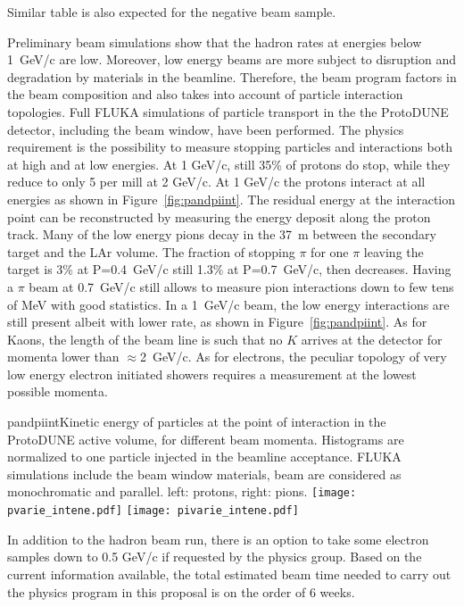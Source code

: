 Similar table is also expected for the negative beam sample. 

Preliminary beam simulations show that the hadron rates at 
energies below 1~GeV/c are low. Moreover, low energy beams are more
subject to disruption and degradation by materials in the
beamline. Therefore, the beam program factors in the beam composition and also takes
into account of particle interaction topologies.  Full FLUKA\cite{fluka05,Fluka15}
 simulations
of particle transport in the the ProtoDUNE detector, including the
beam window, have been performed.
 The physics requirement is the possibility to measure
 stopping particles and  interactions both at high and at low energies.    
At 1 GeV/c, still 35\% of protons do stop, while they reduce to only 5
per mill at 2 GeV/c.  At  1 GeV/c  the protons interact at all
energies as shown in
Figure~\ref{fig:pandpiint}. The residual energy at the interaction
point can be reconstructed by measuring the energy deposit along the proton track.
Many of the  low energy pions decay in the 37~m between the secondary target
and the LAr volume.  The fraction of stopping $\pi$ for one $\pi$
leaving the target is 3\% at P=0.4~GeV/c still  1.3\% at P=0.7~GeV/c,
then decreases.  Having a $\pi$ beam at 0.7~GeV/c still allows to
measure pion interactions down to few tens of MeV with good
statistics. In a 1~GeV/c beam, the low energy interactions are still
present albeit with lower rate, as shown in Figure~\ref{fig:pandpiint}.
As for Kaons, the length of the beam line is such that no
$K$ arrives at the detector for momenta lower than $\approx$2~GeV/c.
As for electrons, the peculiar topology of very low energy electron initiated 
showers requires a measurement at the lowest possible momenta.
\begin{cdrfigure}{pandpiint}{Kinetic energy of
    particles at the point of interaction in the ProtoDUNE active
    volume, for different beam momenta. Histograms are normalized to one particle injected in the
    beamline acceptance. FLUKA simulations include the beam window
    materials, beam are considered as monochromatic and
    parallel. left: protons, right: pions.}
  \texttt{[image: pvarie\_intene.pdf]}
  \texttt{[image: pivarie\_intene.pdf]}
\end{cdrfigure}


In addition to the hadron beam run, there is an option to take some electron samples down to 0.5 GeV/c if requested by the physics group. 
Based on the current information available, the total estimated beam time needed to carry out the physics program in this proposal is on the order of 6 weeks.
 
 




